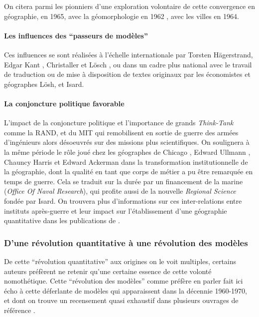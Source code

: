 On citera parmi les pionniers d'une exploration volontaire de cette convergence en géographie, \textcite{Haggett1965} en 1965, \textcite{Chorley1962} avec la géomorphologie en 1962 , \textcite{Berry1964a} avec les villes en 1964. 

\paragraph{Les influences des \enquote{passeurs de modèles}}

Ces influences se sont réalisées à l'échelle internationale par Torsten Hägerstrand, Edgar Kant , Christaller et Lösch \autocite[119]{Berry1970}, ou dans un cadre plus national avec le travail de traduction ou de mise à disposition de textes originaux par les économistes et géographes Lösh, et Isard.

\paragraph{La conjoncture politique favorable}
L'impact de la conjoncture politique et l'importance de grands \textit{Think-Tank} comme la RAND, et du MIT qui remobilisent en sortie de guerre des armées d'ingénieurs alors désoeuvrés sur des missions plus scientifiques. On soulignera à la même période le rôle joué chez les géographes de Chicago \autocite{Harris1979}, Edward Ullmann \autocites{Ullman1941, Harris1977, Glick1988}, Chauncy Harris \autocite{Harris1945, Lichtenberger2005} et Edward Ackerman \autocites{Ackerman1958, Ackerman1963} dans la transformation institutionnelle de la géographie, dont la qualité en tant que corps de métier a pu être remarquée en temps de guerre. Cela se traduit sur la durée par un financement de la marine (\textit{Office Of Naval Research}), qui profite aussi de la nouvelle \textit{Regional Science} fondée par Isard. On trouvera plus d'informations sur ces inter-relations entre instituts après-guerre et leur impact sur l'établissement d'une géographie quantitative dans les publications de \textcites{Barnes2006a, Barnes2008}.

\subsubsection{D'une révolution quantitative à une révolution des modèles}
\label{ssec:revol_modele}

De cette \enquote{révolution quantitative} aux origines on le voit multiples, certains auteurs préfèrent ne retenir qu'une certaine essence de cette volonté nomothétique. Cette \enquote{révolution des modèles} comme préfère en parler \textcite{Wilson1970, Varenne2014} fait ici écho à cette déferlante de modèles qui apparaissent dans la décennie 1960-1970, et dont on trouve un recensement quasi exhaustif dans plusieurs ouvrages de référence \autocite{Haggett1965,Chorley1967}.

